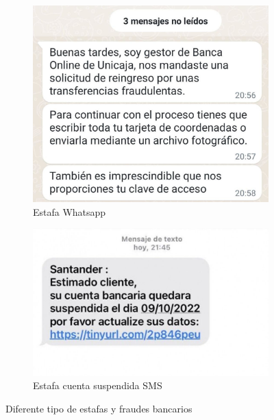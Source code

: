 \documentclass[12pt, a4paper]{report}
\begin{document}
\begin{figure}[H]
	\centering
	\begin{subfigure}[b]{0.35\textwidth}
		\centering
		\includegraphics[scale=0.5]{estafa}
		\caption{Estafa Whatsapp}
		\label{Estafa Whatsapp}
	\end{subfigure}
	\hspace{30mm}
	\begin{subfigure}[b]{0.35\textwidth}
		\centering
		\includegraphics[scale=0.25]{estafa2}
		\caption{Estafa cuenta suspendida SMS}
		\label{Estafa cuenta suspendida SMS}
	\end{subfigure}
	
	\caption{Diferente tipo de estafas y fraudes bancarios}
	\label{Tipos de estafas}
\end{figure}
\end{document}
